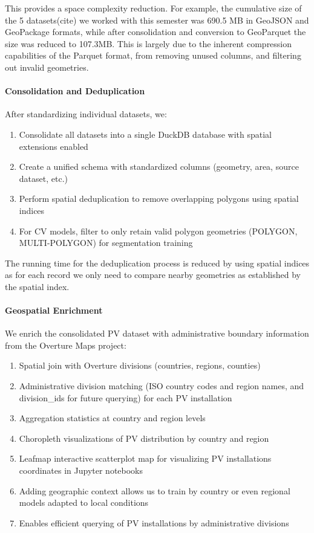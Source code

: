 This provides a space complexity reduction. For example, the cumulative size of the 5 datasets(cite) we worked with this semester was 690.5 MB in GeoJSON and GeoPackage formats, 
while after consolidation and conversion to GeoParquet the size was reduced to 107.3MB. This is largely due to the inherent compression capabilities of the Parquet format, from removing unused columns, 
and filtering out invalid geometries. 

\paragraph{Consolidation and Deduplication}
After standardizing individual datasets, we:
\begin{enumerate}
    \item Consolidate all datasets into a single DuckDB database with spatial extensions enabled
    \item Create a unified schema with standardized columns (geometry, area, source dataset, etc.)
    \item Perform spatial deduplication to remove overlapping polygons using spatial indices
    \item For CV models, filter to only retain valid polygon geometries (POLYGON, MULTI-POLYGON) for segmentation training
\end{enumerate}

The running time for the deduplication process is reduced by using spatial indices as for each record we only need to compare nearby geometries as established by the spatial index.


\paragraph{Geospatial Enrichment}
We enrich the consolidated PV dataset with administrative boundary information from the Overture Maps project:
\begin{enumerate}
    \item Spatial join with Overture divisions (countries, regions, counties)
    \item Administrative division matching (ISO country codes and region names, and division\_ids for future querying) for each PV installation
    \item Aggregation statistics at country and region levels
    \item Choropleth visualizations of PV distribution by country and region
    \item Leafmap interactive scatterplot map for visualizing PV installations coordinates in Jupyter notebooks
    \item Adding geographic context allows us to train by country or even regional models adapted to local conditions
    \item Enables efficient querying of PV installations by administrative divisions
\end{enumerate}

